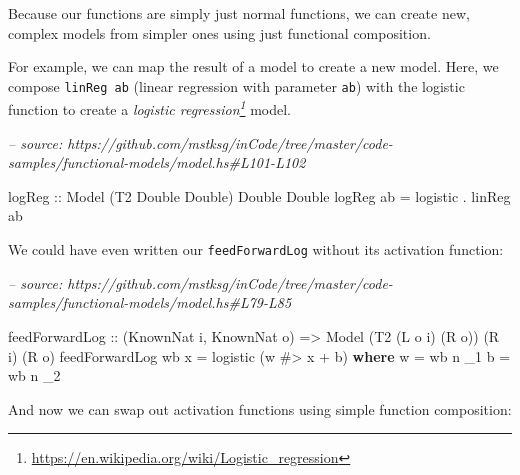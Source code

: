 \documentclass[]{article}
\newenvironment{Shaded}{}{}
\newcommand{\CommentTok}[1]{\textcolor[rgb]{0.38,0.63,0.69}{\textit{#1}}}
\newcommand{\DataTypeTok}[1]{\textcolor[rgb]{0.56,0.13,0.00}{#1}}
\newcommand{\FunctionTok}[1]{\textcolor[rgb]{0.02,0.16,0.49}{#1}}
\newcommand{\KeywordTok}[1]{\textcolor[rgb]{0.00,0.44,0.13}{\textbf{#1}}}
\newcommand{\NormalTok}[1]{#1}
\newcommand{\OtherTok}[1]{\textcolor[rgb]{0.00,0.44,0.13}{#1}}
\renewcommand{\href}[2]{#2\footnote{\url{#1}}}
\begin{document}
Because our functions are simply just normal functions, we can create new,
complex models from simpler ones using just functional composition.

For example, we can map the result of a model to create a new model. Here, we
compose \texttt{linReg\ ab} (linear regression with parameter \texttt{ab}) with
the logistic function to create a
\emph{\href{https://en.wikipedia.org/wiki/Logistic_regression}{logistic
regression}} model.

\begin{Shaded}
\begin{Highlighting}[]
\CommentTok{-- source: https://github.com/mstksg/inCode/tree/master/code-samples/functional-models/model.hs#L101-L102}

\OtherTok{logReg ::} \DataTypeTok{Model}\NormalTok{ (}\DataTypeTok{T2} \DataTypeTok{Double} \DataTypeTok{Double}\NormalTok{) }\DataTypeTok{Double} \DataTypeTok{Double}
\NormalTok{logReg ab }\FunctionTok{=}\NormalTok{ logistic }\FunctionTok{.}\NormalTok{ linReg ab}
\end{Highlighting}
\end{Shaded}

We could have even written our \texttt{feedForwardLog} without its activation
function:

\begin{Shaded}
\begin{Highlighting}[]
\CommentTok{-- source: https://github.com/mstksg/inCode/tree/master/code-samples/functional-models/model.hs#L79-L85}

\NormalTok{feedForwardLog}
\OtherTok{    ::}\NormalTok{ (}\DataTypeTok{KnownNat}\NormalTok{ i, }\DataTypeTok{KnownNat}\NormalTok{ o)}
    \OtherTok{=>} \DataTypeTok{Model}\NormalTok{ (}\DataTypeTok{T2}\NormalTok{ (}\DataTypeTok{L}\NormalTok{ o i) (}\DataTypeTok{R}\NormalTok{ o)) (}\DataTypeTok{R}\NormalTok{ i) (}\DataTypeTok{R}\NormalTok{ o)}
\NormalTok{feedForwardLog wb x }\FunctionTok{=}\NormalTok{ logistic (w }\FunctionTok{#>}\NormalTok{ x }\FunctionTok{+}\NormalTok{ b)}
  \KeywordTok{where}
\NormalTok{    w }\FunctionTok{=}\NormalTok{ wb }\FunctionTok{^^.}\NormalTok{ _1}
\NormalTok{    b }\FunctionTok{=}\NormalTok{ wb }\FunctionTok{^^.}\NormalTok{ _2}
\end{Highlighting}
\end{Shaded}

And now we can swap out activation functions using simple function composition:
\end{document}
